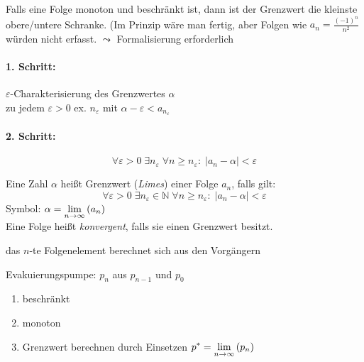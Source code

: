 \newpage
{}

\begin{note}
 Falls eine Folge monoton und beschränkt ist, dann ist der Grenzwert die kleinste obere/untere Schranke. (Im Prinzip wäre man fertig, aber Folgen wie $a_n = \frac{(-1)^n}{n^2}$ würden nicht erfasst. $\leadsto$ Formalisierung erforderlich
\end{note}

\paragraph*{1. Schritt:} $\varepsilon$-Charakterisierung des Grenzwertes $\alpha$ \\
zu jedem $\varepsilon > 0$ ex. $n_\varepsilon$ mit $\alpha-\varepsilon < a_{n_\varepsilon}$
\paragraph*{2. Schritt:}
  \begin{equation*}
    \forall \varepsilon > 0\; \exists n_\varepsilon \;\forall n \geq n_\varepsilon: \;\left|a_n-\alpha\right| < \varepsilon
  \end{equation*}

\begin{definition}[Grenzwert]
  Eine Zahl $\alpha$ heißt Grenzwert (\emph{Limes}) einer Folge $a_n$, falls gilt:
  \begin{equation*}
    \forall \varepsilon > 0\; \exists n_\varepsilon \in \mathbb{N} \;\forall n \geq n_\varepsilon:\; \left| a_n - \alpha \right| < \varepsilon
  \end{equation*}
  Symbol: $\displaystyle\alpha = \lim_{n \rightarrow \infty} \left( a_n \right)$\\
  Eine Folge heißt \emph{konvergent}, falls sie einen Grenzwert besitzt.
\end{definition}

\begin{note}
  das $n$-te Folgenelement berechnet sich aus den Vorgängern
\end{note}

\begin{example}
  Evakuierungspumpe: $p_n$ aus $p_{n-1}$ und $p_0$
\end{example}

\begin{note}
  \begin{enumerate}
   \item beschränkt
   \item monoton
   \item Grenzwert berechnen durch Einsetzen $\displaystyle p^\ast = \lim_{n \rightarrow \infty} \left( p_n \right)$
  \end{enumerate}
\end{note}


